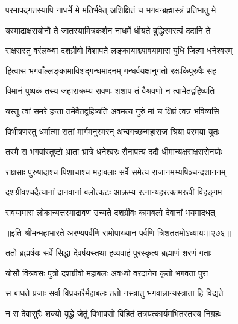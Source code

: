 

\twolineshloka
{परमापद्गतस्यापि नाधर्मे मे मतिर्भवेत्}
{अशिक्षितं च भगवन्ब्रह्मास्त्रं प्रतिभातु मे}



\twolineshloka
{यस्माद्राक्षसयोनौ ते जातस्यामित्रकर्शन}
{नाधर्मे धीयते बुद्धिरमरत्वं ददानि ते}



\twolineshloka
{राक्षसस्तु वरंलब्ध्वा दशग्रीवो विशापते}
{लङ्कायाश्च्यावयामास युधि जित्वा धनेश्वरम्}


\twolineshloka
{हित्वास भगवाँल्लङ्कामाविशद्गन्धमादनम्}
{गन्धर्वयक्षानुगतो रक्षःकिपुरुषैः सह}


\twolineshloka
{विमानं पुष्पकं तस्य जहाराक्रम्य रावणः}
{शशाप तं वैश्रवणो न त्वामेतद्वहिष्यति}


\twolineshloka
{यस्तु त्वां समरे हन्ता तमेवैतद्वहिष्यति}
{अवमत्य गुरुं मां च क्षिप्रं त्वन्न भविष्यसि}


\twolineshloka
{विभीषणस्तु धर्मात्मा सतां मार्गमनुस्मरन्}
{अन्वगच्छन्महाराज श्रिया परमया युतः}


\twolineshloka
{तस्मै स भगवांस्तुष्टो भ्राता भ्रात्रे धनेश्वरः}
{सैनापत्यं ददौ धीमान्यक्षराक्षससेनयोः}


\twolineshloka
{राक्षसाः पुरुषादाश्च पिशाचाश्च महाबलाः}
{सर्वे समेत्य राजानमभ्यषिञ्चन्दशाननम्}


\twolineshloka
{दशग्रीवश्चदैत्यानां दानवानां बलोत्कटः}
{आक्रम्य रत्नान्यहरत्कामरूपी विहङ्गम}


\twolineshloka
{रावयामास लोकान्यत्तस्माद्रावण उच्यते}
{दशग्रीवः कामबलो देवानां भयमादधत्}


॥इति श्रीमन्महाभारते अरण्यपर्वणि रामोपाख्यान-पर्वणि त्रिशततमोऽध्यायः॥२७६॥

\storymeta

\resetShloka



\twolineshloka
{ततो ब्रह्मर्षयः सर्वे सिद्धा देवर्षयस्तथा}
{हव्यवाहं पुरस्कृत्य ब्रह्माणं शरणं गताः}



\twolineshloka
{योसौ विश्रवसः पुत्रो दशग्रीवो महाबलः}
{अवध्यो वरदानेन कृतो भगवता पुरा}


\twolineshloka
{स बाधते प्रजाः सर्वा विप्रकारैर्महाबलः}
{ततो नस्त्रातु भगवान्नान्यस्त्राता हि विद्यते}



\twolineshloka
{न स देवासुरैः शक्यो युद्धे जेतुं विभावसो}
{विहितं तत्रयत्कार्यमभितस्तस्य निग्रहः}


